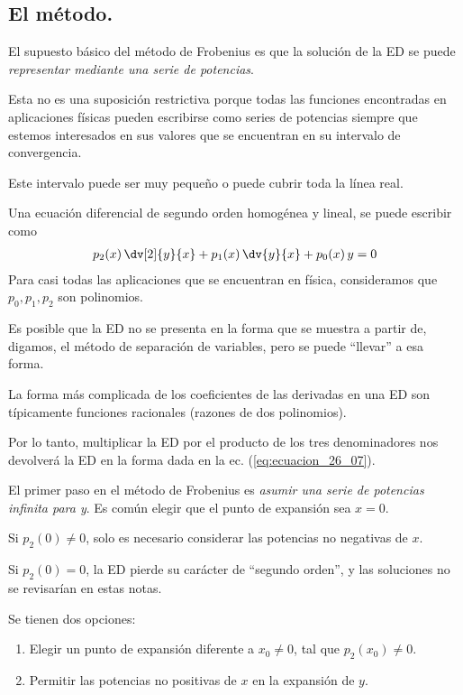 \subsection{El método.}

El supuesto básico del método de Frobenius es que la solución de la ED se puede \emph{representar mediante una serie de potencias}.
\par
Esta no es una suposición restrictiva porque todas las funciones encontradas en aplicaciones físicas pueden escribirse como series de potencias siempre que estemos interesados en sus valores que se encuentran en su intervalo de convergencia.
\par
Este intervalo puede ser muy pequeño o puede cubrir toda la línea real.
\par
Una ecuación diferencial de segundo orden homogénea y lineal, se puede escribir como
\begin{align}
p_{2} (x) \, \dv[2]{y}{x} + p_{1} (x) \, \dv{y}{x} + p_{0}(x) \, y = 0
\label{eq:ecuacion_26_07}    
\end{align}
Para casi todas las aplicaciones que se encuentran en física, consideramos que $p_{0}, p_{1}, p_{2}$ son polinomios.
\par
Es posible que la ED no se presenta en la forma que se muestra a partir de, digamos, el método de separación de variables, pero se puede \enquote{llevar} a esa forma.
\par
La forma más complicada de los coeficientes de las derivadas en una ED son típicamente funciones racionales (razones de dos polinomios).
\par
Por lo tanto, multiplicar la ED por el producto de los tres denominadores nos devolverá la ED en la forma dada en la ec. (\ref{eq:ecuacion_26_07}).
\par
El primer paso en el método de Frobenius es \emph{asumir una serie de potencias infinita para y}. Es común elegir que el punto de expansión sea $x = 0$.
\par
Si $p_{2} (0) \neq 0$, solo es necesario considerar las potencias no negativas de $x$.
\par
Si $p_{2} (0) = 0$, la ED pierde su carácter de \enquote{segundo orden}, y las soluciones no se revisarían en estas notas.
\par
Se tienen dos opciones:
\begin{enumerate}
\item Elegir un punto de expansión diferente a $x_{0} \neq 0$, tal que $p_{2} (x_{0}) \neq 0$.
\item Permitir las potencias no positivas de $x$ en la expansión de $y$.
\end{enumerate}
